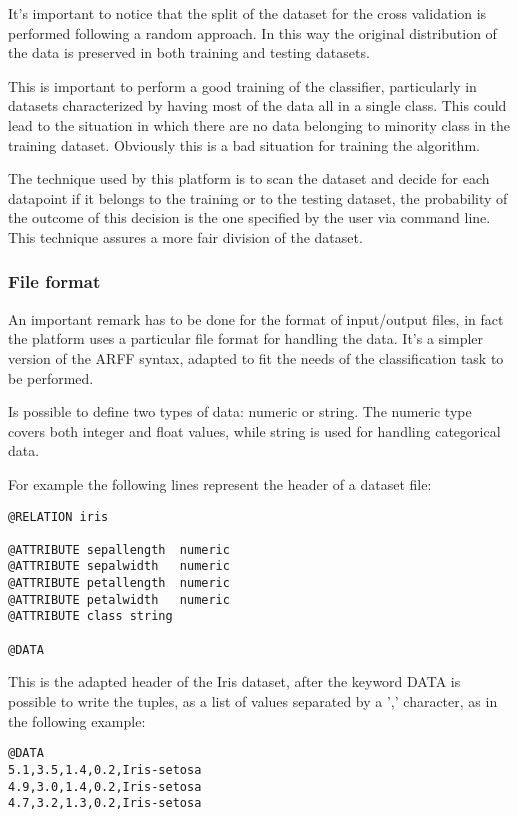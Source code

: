 \documentclass{acm_proc_article-sp-sigmod07}
\begin{document}
It's important to notice that the split of the dataset for the cross
validation is performed following a random approach. In this way the
original distribution of the data is preserved in both training and
testing datasets.

This is important to perform a good training of the classifier,
particularly in datasets characterized by having most of the data all in a
single class. This could lead to the situation in which there are no data
belonging to minority class in the training dataset.
Obviously this is a bad situation for training the algorithm.

The technique used by this platform is to scan the dataset and decide for
each datapoint if it belongs to the training or to the testing dataset,
the probability of the outcome of this decision is the one specified by
the user via command line.
This technique assures a more fair division of the dataset.

\subsubsection{File format}
An important remark has to be done for the format of input/output files,
in fact the platform uses a particular file format for handling the data.
It's a simpler version of the ARFF syntax, adapted to fit the needs of the
classification task to be performed.

Is possible to define two types of data: numeric or string. The numeric
type covers both integer and float values, while string is used for
handling categorical data.

For example the following lines represent the header of a dataset file:

\begin{verbatim}
@RELATION iris

@ATTRIBUTE sepallength	numeric
@ATTRIBUTE sepalwidth 	numeric
@ATTRIBUTE petallength 	numeric
@ATTRIBUTE petalwidth	numeric
@ATTRIBUTE class string 

@DATA
\end{verbatim}

This is the adapted header of the Iris dataset, after the keyword DATA
is possible to write the tuples, as a list of values separated by a ','
character, as in the following example:

\begin{verbatim}
@DATA
5.1,3.5,1.4,0.2,Iris-setosa
4.9,3.0,1.4,0.2,Iris-setosa
4.7,3.2,1.3,0.2,Iris-setosa
\end{verbatim}
\end{document}
